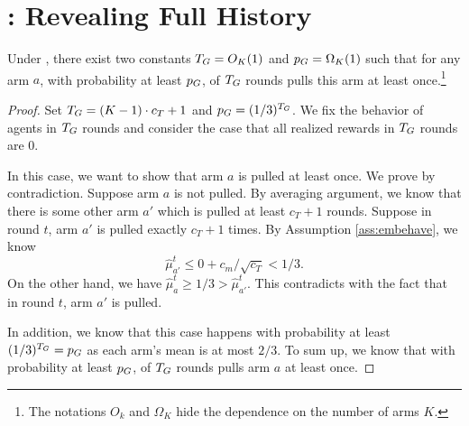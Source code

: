 \section{\ALGG: Revealing Full History}


\begin{lemma}
\label{lem:greedy}
Under , there exist two constants $T_G = O_K(1)$
and $p_G = \Omega_K(1)$ such that for any arm $a$, with probability
at least $p_G$, \ALGG of $T_G$ rounds pulls this arm at least
once.\footnote{The notations $O_k$ and $\Omega_K$ hide the dependence
  on the number of arms $K$.}
\end{lemma}

\begin{proof}
  Set $T_G = (K-1) \cdot c_T + 1$ and $p_G = (1/3)^{T_G}$. We fix
  the behavior of agents in $T_G$ rounds and consider the case that
  all realized rewards in $T_G$ rounds are 0.

In this case, we want to show that arm $a$ is pulled at least once. We prove by contradiction. Suppose arm $a$ is not pulled. By averaging argument, we know that there is some other arm $a'$ which is pulled at least $c_T + 1$ rounds. Suppose in round $t$, arm $a'$ is pulled exactly $c_T + 1$ times. By Assumption \ref{ass:embehave}, we know 
\[
\hat{\mu}_{a'}^t \leq 0 + c_m / \sqrt{c_T} < 1/3. 
\]
On the other hand, we have $\hat{\mu}_a^t \geq 1/3 > \hat{\mu}_{a'}^t$. This contradicts with the fact that in round $t$, arm $a'$ is pulled. 

In addition, we know that this case happens with probability at least
$(1/3)^{T_G} = p_G$ as each arm's mean is at most $2/3$. To sum up,
we know that with probability at least $p_G$, \ALGG of $T_G$ rounds
pulls arm $a$ at least once.
\end{proof}
